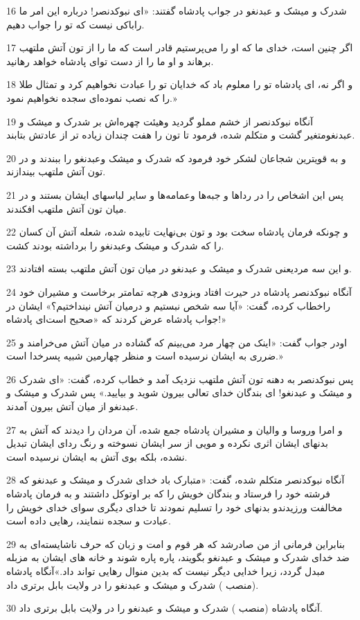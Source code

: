 \par 16 شدرک و میشک و عبدنغو در جواب پادشاه گفتند: «ای نبوکدنصر! درباره این امر ما راباکی نیست که تو را جواب دهیم.
\par 17 اگر چنین است، خدای ما که او را می‌پرستیم قادر است که ما را از تون آتش ملتهب برهاند و او ما را از دست تو‌ای پادشاه خواهد رهانید.
\par 18 و اگر نه، ای پادشاه تو را معلوم باد که خدایان تو را عبادت نخواهیم کرد و تمثال طلا را که نصب نموده‌ای سجده نخواهیم نمود.»
\par 19 آنگاه نبوکدنصر از خشم مملو گردید وهیئت چهره‌اش بر شدرک و میشک و عبدنغومتغیر گشت و متکلم شده، فرمود تا تون را هفت چندان زیاده تر از عادتش بتابند.
\par 20 و به قویترین شجاعان لشکر خود فرمود که شدرک و میشک وعبدنغو را ببندند و در تون آتش ملتهب بیندازند.
\par 21 پس این اشخاص را در رداها و جبه‌ها وعمامه‌ها و سایر لباسهای ایشان بستند و در میان تون آتش ملتهب افکندند.
\par 22 و چونکه فرمان پادشاه سخت بود و تون بی‌نهایت تابیده شده، شعله آتش آن کسان را که شدرک و میشک وعبدنغو را برداشته بودند کشت.
\par 23 و این سه مردیعنی شدرک و میشک و عبدنغو در میان تون آتش ملتهب بسته افتادند.
\par 24 آنگاه نبوکدنصر پادشاه در حیرت افتاد وبزودی هر‌چه تمامتر برخاست و مشیران خود راخطاب کرده، گفت: «آیا سه شخص نبستیم و درمیان آتش نینداختیم؟» ایشان در جواب پادشاه عرض کردند که «صحیح است‌ای پادشاه!»
\par 25 اودر جواب گفت: «اینک من چهار مرد می‌بینم که گشاده در میان آتش می‌خرامند و ضرری به ایشان نرسیده است و منظر چهارمین شبیه پسرخدا است.»
\par 26 پس نبوکدنصر به دهنه تون آتش ملتهب نزدیک آمد و خطاب کرده، گفت: «ای شدرک و میشک و عبدنغو! ای بندگان خدای تعالی بیرون شوید و بیایید.» پس شدرک و میشک و عبدنغو از میان آتش بیرون آمدند.
\par 27 و امرا وروسا و والیان و مشیران پادشاه جمع شده، آن مردان را دیدند که آتش به بدنهای ایشان اثری نکرده و مویی از سر ایشان نسوخته و رنگ ردای ایشان تبدیل نشده، بلکه بوی آتش به ایشان نرسیده است.
\par 28 آنگاه نبوکدنصر متکلم شده، گفت: «متبارک باد خدای شدرک و میشک و عبدنغو که فرشته خود را فرستاد و بندگان خویش را که بر اوتوکل داشتند و به فرمان پادشاه مخالفت ورزیدندو بدنهای خود را تسلیم نمودند تا خدای دیگری سوای خدای خویش را عبادت و سجده ننمایند، رهایی داده است.
\par 29 بنابراین فرمانی از من صادرشد که هر قوم و امت و زبان که حرف ناشایسته‌ای به ضد خدای شدرک و میشک و عبدنغو بگویند، پاره پاره شوند و خانه های ایشان به مزبله مبدل گردد، زیرا خدایی دیگر نیست که بدین منوال رهایی تواند داد.»آنگاه پادشاه (منصب ) شدرک و میشک و عبدنغو را در ولایت بابل برتری داد.
\par 30 آنگاه پادشاه (منصب ) شدرک و میشک و عبدنغو را در ولایت بابل برتری داد.

